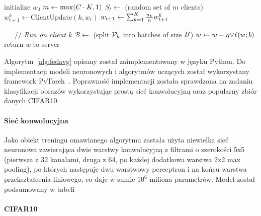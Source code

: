   \begin{polishalgorithm}[t]
    \begin{algorithmic}
      \STATE{} initialize $w_0$
        \STATE{} $m \leftarrow \max(C\cdot K, 1)$
        \STATE{} $S_t \leftarrow$ (random set of $m$ clients)
          \STATE{} $w_{t+1}^k \leftarrow \text{ClientUpdate}(k, w_t)$ 
        \ENDFOR{}
        \STATE{} $w_{t+1} \leftarrow \sum_{k=1}^K \frac{n_k}{n} w_{t+1}^k$
      \ENDFOR{}
      \STATE{}
    
    \ \ \  // \emph{Run on client $k$}
      \STATE{} $\mathcal{B} \leftarrow$ (split $\mathcal{P}_k$ into batches of size $B$)
          \STATE{} $w \leftarrow w - \eta \triangledown \ell(w; b)$
        \ENDFOR{}
    \ENDFOR{}
    \STATE{} return $w$ to server
    \end{algorithmic}
    \label{alg:fedavg}
    \end{polishalgorithm}


  Algorytm~\ref{alg:fedavg} opisany został zaimplementowany w języku Python. Do implementacji modeli
  neuronowych i algorytmów uczących został wykorzystany framework
  PyTorch~\cite{paszke2017automatic}. Poprawność implementacji została sprawdzona na zadaniu klasyfikacji obrazów wykorzystując prostą sieć konwolucyjną oraz popularny zbiór danych CIFAR10. 

  \paragraph{Sieć konwolucyjna}

  Jako obiekt treningu omawianego algorytmu zastała użyta niewielka sieć neuronowa zawierająca
  dwie warstwy konwolucyjną z filtrami o szerokości 5x5 (pierwsza z 32 kanałami, druga z 64, po
  każdej dodatkowa warstwa 2x2 max pooling), po których następuje dwu-warstwowy perceptron i na
  końcu warstwa przekształcenia liniowego, co daje w sumie \(10^6\) miliona parametrów. Model został podsumowany w tabeli 


  \paragraph{CIFAR10}

